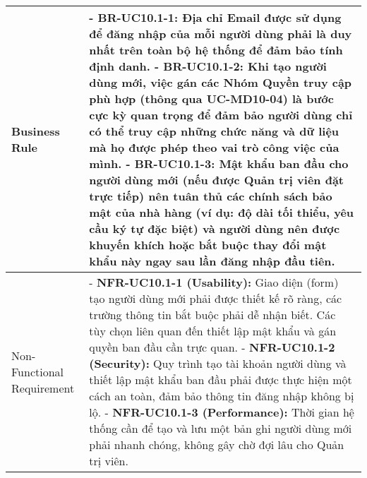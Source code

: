 \begin{longtable}{|m{4cm}|p{11cm}|}
Business Rule & - \textbf{BR-UC10.1-1:} Địa chỉ Email được sử dụng để đăng nhập của mỗi người dùng phải là duy nhất trên toàn bộ hệ thống để đảm bảo tính định danh. \newline - \textbf{BR-UC10.1-2:} Khi tạo người dùng mới, việc gán các Nhóm Quyền truy cập phù hợp (thông qua UC-MD10-04) là bước cực kỳ quan trọng để đảm bảo người dùng chỉ có thể truy cập những chức năng và dữ liệu mà họ được phép theo vai trò công việc của mình. \newline - \textbf{BR-UC10.1-3:} Mật khẩu ban đầu cho người dùng mới (nếu được Quản trị viên đặt trực tiếp) nên tuân thủ các chính sách bảo mật của nhà hàng (ví dụ: độ dài tối thiểu, yêu cầu ký tự đặc biệt) và người dùng nên được khuyến khích hoặc bắt buộc thay đổi mật khẩu này ngay sau lần đăng nhập đầu tiên. \\
\hline
Non-Functional Requirement & - \textbf{NFR-UC10.1-1 (Usability):} Giao diện (form) tạo người dùng mới phải được thiết kế rõ ràng, các trường thông tin bắt buộc phải dễ nhận biết. Các tùy chọn liên quan đến thiết lập mật khẩu và gán quyền ban đầu cần trực quan. \newline - \textbf{NFR-UC10.1-2 (Security):} Quy trình tạo tài khoản người dùng và thiết lập mật khẩu ban đầu phải được thực hiện một cách an toàn, đảm bảo thông tin đăng nhập không bị lộ. \newline - \textbf{NFR-UC10.1-3 (Performance):} Thời gian hệ thống cần để tạo và lưu một bản ghi người dùng mới phải nhanh chóng, không gây chờ đợi lâu cho Quản trị viên. \\
\hline
\end{longtable}


